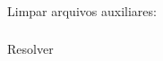 \begin{frame}
  \frametitle{}
  \Huge
  Limpar arquivos auxiliares:

\end{frame}

\begin{frame}
  \frametitle{}
  \Huge
  Resolver 
\end{frame}
